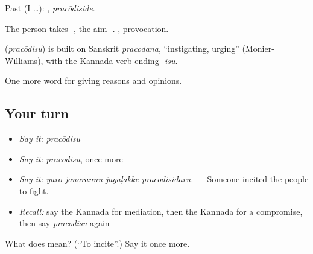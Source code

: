 Past (I …): , \emph{pracōdiside}.

The person takes -, the aim -. , provocation.

\begin{cousinweb}
\textbf{} (\emph{pracōdisu}) is built on Sanskrit \emph{pracodana}, \textquotedblleft{}instigating, urging\textquotedblright{} (Monier-Williams), with the Kannada verb ending -\emph{isu}.
\end{cousinweb}

\begin{grammarlens}[title={What you've built}]
One more word for giving reasons and opinions.
\end{grammarlens}

\subsection*{Your turn}
\begin{itemize}
\raggedright
  \item \emph{Say it:} \emph{pracōdisu}
  \item \emph{Say it:} \emph{pracōdisu}, once more
  \item \emph{Say it:} \emph{yārō janarannu jagaḷakke pracōdisidaru.} — Someone incited the people to fight.
  \item \emph{Recall:} say the Kannada for mediation, then the Kannada for a compromise, then say \emph{pracōdisu} again
\end{itemize}

\begin{tcolorbox}[breakable,colback=teal!4,colframe=teal!35!black,title={Before you move on}]
What does  mean? (\textquotedblleft{}To incite\textquotedblright{}.) Say it once more.
\end{tcolorbox}
